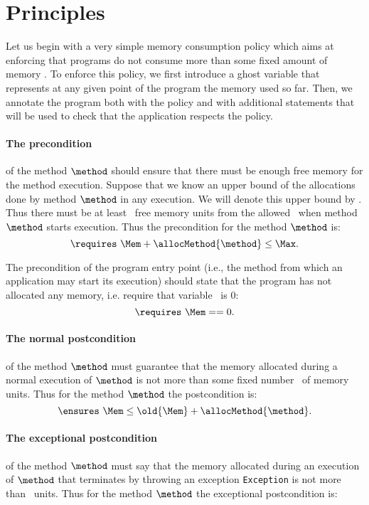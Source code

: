 


\section{Principles} \label{sec:principles}
Let us begin with a very simple memory consumption policy which aims
at enforcing that  programs do not consume more than
some fixed amount of memory \Max . To enforce this policy, we first
introduce a ghost variable \Mem{} that represents at any given point of
the program the memory used so far. Then, we annotate the program both
with the policy and with additional statements that will be used to
check that the application respects the policy.



\paragraph{The precondition} of the method $\method$ should ensure that
there must be enough free memory for the method execution. Suppose
that we know an upper bound of the allocations done by method $\method$
in any execution. We will denote this upper bound by
\allocMethod{\method}. Thus there must be at least
\allocMethod{\method}\ free memory units from the allowed \Max\ when
method $\method$ starts execution. Thus the precondition for the method
$\method$ is:
$$
\requires \ \Mem + \allocMethod{\method}  \leq \Max.
$$

The precondition of the
program entry point (i.e., the method from which an application
may start its execution) should state that the program has not
allocated any memory, i.e. require that variable \Mem \ is  0:
$$
\requires \ \Mem == 0.
$$
\paragraph{The normal postcondition} of the method $\method$ must
guarantee that the memory allocated during a normal execution of
$\method$ is not more than some fixed number \allocMethod{\method}\
of memory units. Thus for the method $\method$ the postcondition is:
$$
\ensures \  \Mem \leq \old{\Mem} + \allocMethod{\method}.
$$

\paragraph{The exceptional postcondition} of the method $\method$ must
say that the memory allocated during an execution of $\method$ that
terminates by throwing an exception \texttt{Exception} is not more
than \allocMethod{\method}\ units. Thus for the method $\method$ the
exceptional postcondition is:

